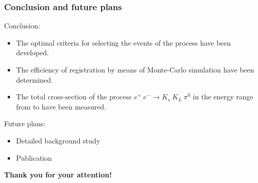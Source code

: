 \documentclass[14pt, hyperref = {colorlinks}]{beamer}
\begin{document}

\begin{frame}
\frametitle{Conclusion and future plans}
Conclusion:
\begin{itemize}
    \item The optimal criteria for selecting the events of the process have been developed.
    \item The efficiency of registration by means of Monte-Carlo simulation have been determined.
  \item The total cross-section of the process ${e^+\: e^ - \to K_{s}\:K_{L}\:\pi^0}$ in the energy range from  to  have been measured.
\end{itemize}
Future plans:
\begin{itemize}
    \item Detailed background study
    \item Publication
\end{itemize}
\end{frame}


\begin{frame}
\begin{center}
\textbf{Thank you for your attention!}
\end{center}
\end{frame}
\end{document}
